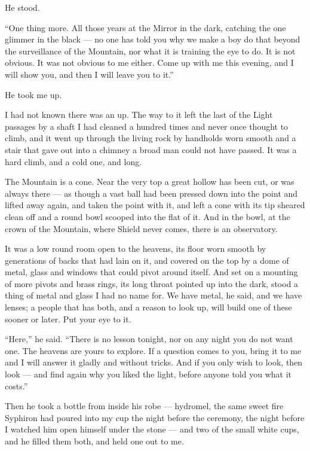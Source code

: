 He stood.\par

``One thing more. All those years at the Mirror in the dark, catching the one glimmer in the black --- no one has told you why we make a boy do that beyond the surveillance of the Mountain, nor what it is training the eye to do. It is not obvious. It was not obvious to me either. Come up with me this evening, and I will show you, and then I will leave you to it.''\par

He took me up.\par

I had not known there was an up. The way to it left the last of the Light passages by a shaft I had cleaned a hundred times and never once thought to climb, and it went up through the living rock by handholds worn smooth and a stair that gave out into a chimney a broad man could not have passed. It was a hard climb, and a cold one, and long.\par

The Mountain is a cone. Near the very top a great hollow has been cut, or was always there --- as though a vast ball had been pressed down into the point and lifted away again, and taken the point with it, and left a cone with its tip sheared clean off and a round bowl scooped into the flat of it. And in the bowl, at the crown of the Mountain, where Shield never comes, there is an observatory.\par

It was a low round room open to the heavens, its floor worn smooth by generations of backs that had lain on it, and covered on the top by a dome of metal, glass and windows that could pivot around itself. And set on a mounting of more pivots and brass rings, its long throat pointed up into the dark, stood a thing of metal and glass I had no name for. We have metal, he said, and we have lenses; a people that has both, and a reason to look up, will build one of these sooner or later. Put your eye to it.\par

``Here,'' he said. ``There is no lesson tonight, nor on any night you do not want one. The heavens are yours to explore. If a question comes to you, bring it to me and I will answer it gladly and without tricks. And if you only wish to look, then look --- and find again why you liked the light, before anyone told you what it costs.''\par

Then he took a bottle from inside his robe --- hydromel, the same sweet fire Syphiron had poured into my cup the night before the ceremony, the night before I watched him open himself under the stone --- and two of the small white cups, and he filled them both, and held one out to me.\par

